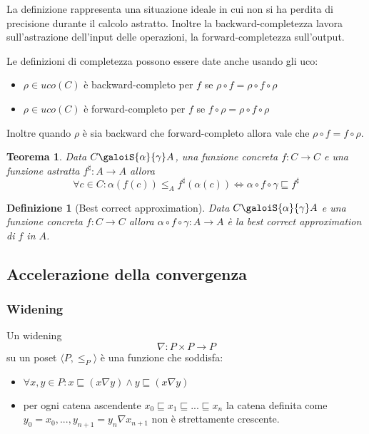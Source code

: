 \documentclass[a4paper, 10pt]{article}
\newtheorem{definit}{Definizione}[subsection]
\newtheorem{thm}{Teorema}[subsection]
\begin{document}
	La definizione rappresenta una situazione ideale in cui non si ha perdita di precisione durante il calcolo astratto. Inoltre la backward-completezza lavora sull'astrazione dell'input delle operazioni, la forward-completezza sull'output.
	
	Le definizioni di completezza possono essere date anche usando gli uco: \begin{itemize}
		\item $\rho \in uco(C)$ è backward-completo per $f$ se $\rho \circ f = \rho \circ f \circ \rho$
		\item $\rho \in uco(C)$ è forward-completo per $f$ se $f \circ \rho = \rho \circ f \circ \rho$
	\end{itemize}

	Inoltre quando $\rho$ è sia backward che forward-completo allora vale che $\rho \circ f = f \circ \rho$.
	
	\begin{thm}
		Data $C \galoiS{\alpha}{\gamma} A$, una funzione concreta $f : C \to C$  e una funzione astratta $f^\sharp: A \to A$ allora  \[ \forall c \in C: \alpha(f(c)) \leq_A f^\sharp(\alpha(c)) \Leftrightarrow \alpha \circ f \circ \gamma \sqsubseteq f^\sharp \]
	\end{thm}

	\begin{definit}[Best correct approximation]
		Data $C \galoiS{\alpha}{\gamma} A$ e una funzione concreta $f : C \to C$ allora $\alpha \circ f \circ \gamma : A \to A$ è la best correct approximation di $f$ in $A$.
	\end{definit}

	\subsection{Accelerazione della convergenza}
	\subsubsection{Widening}
	Un widening \[ \nabla : P \times P \to P  \] su un poset $ \langle P, \leq_P \rangle $ è una funzione che soddisfa:
	\begin{itemize}
		\item $\forall x,y \in P : x \sqsubseteq (x \nabla y ) \wedge y \sqsubseteq (x \nabla y)$
		\item per ogni catena ascendente $x_0 \sqsubseteq x_1 \sqsubseteq ... \sqsubseteq x_n$ la catena definita come $y_0 = x_0, ..., y_{n+1} = y_n \nabla x_{n+1}$ non è strettamente crescente.
	\end{itemize}
	
\end{document}
